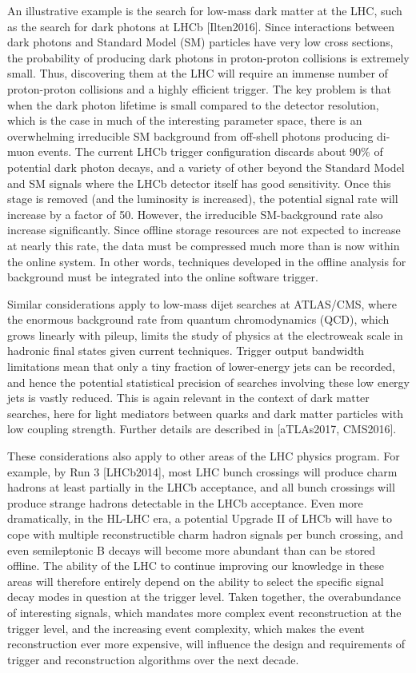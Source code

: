 An illustrative example is the search for low-mass dark matter at the LHC, such as the  search for dark photons at LHCb [Ilten2016].  Since interactions between dark photons and Standard Model (SM) particles have very low cross sections, the probability of producing dark photons in proton-proton collisions is extremely small. Thus, discovering them at the LHC will require an immense number of proton-proton collisions and a highly efficient trigger. The key problem is that when the dark photon lifetime is small compared to the detector resolution, which is the case in much of the interesting parameter space, there is an overwhelming irreducible SM background from off-shell photons producing di-muon events. The current LHCb trigger configuration discards about 90\% of potential dark photon decays, and a variety of other beyond the Standard Model and SM signals where the LHCb detector itself has good sensitivity. Once this stage is removed (and the luminosity is increased), the potential signal rate will increase by a factor of 50. However, the irreducible SM-background rate also increase significantly. Since offline storage resources are not expected to increase at nearly this rate, the data must be compressed much more than is now within the online system. In other words, techniques developed in the offline analysis for background must be integrated into the online software trigger. 

Similar considerations apply to low-mass dijet searches at ATLAS/CMS, where the enormous background rate from quantum chromodynamics (QCD), which grows linearly with pileup, limits the study of physics at the electroweak scale in hadronic final states given current techniques. Trigger output bandwidth limitations mean that only a tiny fraction of lower-energy jets can be recorded, and hence the potential statistical precision of searches involving these low energy jets is vastly reduced. This is again relevant in the context of dark matter searches, here for light mediators between quarks and dark matter particles with low coupling strength. Further details are described in [aTLAs2017, CMS2016].

These considerations also apply to other areas of the LHC physics program. For example, by Run 3 [LHCb2014], most LHC bunch crossings will produce charm hadrons at least partially in the LHCb acceptance, and all bunch crossings will produce strange hadrons detectable in the LHCb acceptance. Even more dramatically, in the HL-LHC era, a potential Upgrade II of LHCb will have to cope with multiple reconstructible charm hadron signals per bunch crossing, and even semileptonic B decays will become more abundant than can be stored offline. The ability of the LHC to continue improving our knowledge in these areas will therefore entirely depend on the ability to select the specific signal decay modes in question at the trigger level. Taken together, the overabundance of interesting signals, which mandates more complex event reconstruction at the trigger level, and the increasing event complexity, which makes the event reconstruction ever more expensive, will influence the design and requirements of trigger and reconstruction algorithms over the next decade.

